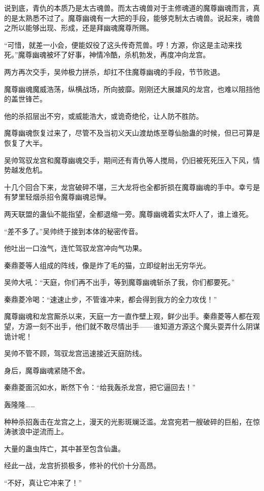 \begin{this_body}
说到底，青仇的本质乃是太古魂兽。而太古魂兽对于主修魂道的魔尊幽魂而言，真的是太熟悉不过了。魔尊幽魂有一大把的手段，能够克制太古魂兽。说起来，魂兽之所以能够出现、形成，还是拜幽魂魔尊所赐。

“可惜，就差一小会，便能奴役了这头传奇荒兽。哼！方源，你这是主动来找死。”魔尊幽魂被坏了好事，神情冷酷，杀机勃发，再度冲向龙宫。

两方再次交手，吴帅极力拼杀，却扛不住魔尊幽魂的手段，节节败退。

魔尊幽魂魔威浩荡，纵横战场，所向披靡。刚刚还大展雄风的龙宫，也难以阻挡他的盖世锋芒。

他的杀招层出不穷，或威能浩大，或诡奇绝伦，让人防不胜防。

魔尊幽魂恢复过来了，尽管不及当初义天山渡劫炼至尊仙胎蛊的时候，但已可算是恢复了大半。

吴帅驾驭龙宫和魔尊幽魂交手，期间还有青仇等人搅局，仍旧被死死压入下风，情势越发危机。

十几个回合下来，龙宫破碎不堪，三大龙将也全都折损在魔尊幽魂的手中。幸亏是有梦里轻烟杀招令魔尊幽魂忌惮。

两天联盟的蛊仙不能指望，全都退缩一旁。魔尊幽魂着实太吓人了，谁上谁死。

“差不多了。”吴帅终于接到本体的秘密传音。

他吐出一口浊气，连忙驾驭龙宫冲向气功果。

秦鼎菱等人组成的阵线，像是炸了毛的猫，立即绽射出无穷华光。

吴帅大吼：“天庭，你们再不出手，等到魔尊幽魂斩杀了我，你们都要死。”

秦鼎菱冷喝：“速速止步，不管谁冲来，都会得到我方的全力攻伐！”

魔尊幽魂和龙宫厮杀以来，天庭一方一直作壁上观，鲜少出手。秦鼎菱等人都在观望，方源一刻不出手，他们就不敢尽情出手——谁知道方源这个魔头耍弄什么阴谋诡计呢！

吴帅不管不顾，驾驭龙宫迅速接近天庭防线。

身后，魔尊幽魂紧随不舍。

秦鼎菱面沉如水，断然下令：“给我轰杀龙宫，把它逼回去！”

轰隆隆……

种种杀招轰击在龙宫之上，漫天的光影斑斓泛滥。龙宫宛若一艘破碎的巨船，在惊涛骇浪中逆流而上。

大量的蛊虫阵亡，其中甚至包含仙蛊。

经此一战，龙宫折损极多，修补的代价十分高昂。

“不好，真让它冲来了！”


\end{this_body}
